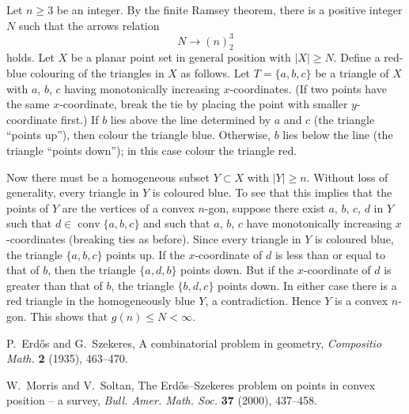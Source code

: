 \documentclass[12pt]{article}
\DeclareMathOperator{\conv}{conv}
\begin{document}
Let $n\ge 3$ be an integer.  By the finite Ramsey theorem, there is a positive integer $N$ such that the arrows relation
\[
N\to(n)^3_2
\]
holds.  Let $X$ be a planar point set in general position with $|X|\ge N$.  Define a red-blue colouring of the triangles in $X$ as follows.  Let $T=\{a,b,c\}$ be a triangle of $X$ with $a$, $b$, $c$ having monotonically increasing $x$-coordinates.  (If two points have the same $x$-coordinate, break the tie by placing the point with smaller $y$-coordinate first.)  If $b$ lies above the line determined by $a$ and $c$ (the triangle ``points up''), then colour the triangle blue.  Otherwise, $b$ lies below the line (the triangle ``points down''); in this case colour the triangle red.

Now there must be a homogeneous subset $Y\subset X$ with $|Y|\ge n$.  Without loss of generality, every triangle in $Y$ is coloured blue.  To see that this implies that the points of $Y$ are the vertices of a convex $n$-gon, suppose there exist $a$, $b$, $c$, $d$ in $Y$ such that $d\in\conv\{a,b,c\}$ and such that $a$, $b$, $c$ have monotonically increasing $x$-coordinates (breaking ties as before).  Since every triangle in $Y$ is coloured blue, the triangle $\{a,b,c\}$ points up.  If the $x$-coordinate of $d$ is less than or equal to that of $b$, then the triangle $\{a,d,b\}$ points down.  But if the $x$-coordinate of $d$ is greater than that of $b$, the triangle $\{b,d,c\}$ points down.  In either case there is a red triangle in the homogeneously blue $Y$, a contradiction.  Hence $Y$ is a convex $n$-gon.  This shows that $g(n)\le N<\infty$.

\begin{thebibliography}{9}
P.~Erd\H{o}s and G.~Szekeres, A combinatorial problem in geometry, {\it Compositio Math.} {\bf 2} (1935), 463--470.

W.~Morris and V.~Soltan, The Erd\H{o}s--Szekeres problem on points in convex position -- a survey, {\it Bull. Amer. Math. Soc.} {\bf 37} (2000), 437--458.
\end{thebibliography}
\end{document}
